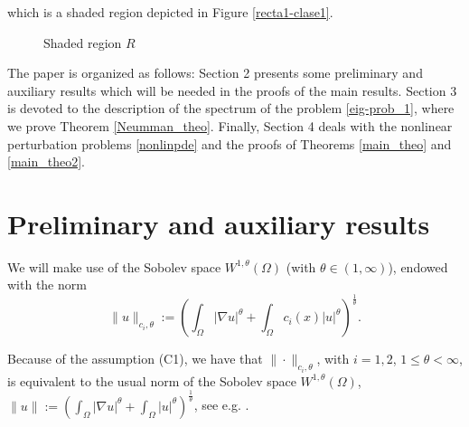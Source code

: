 \documentclass[pdflatex,sn-mathphys-num]{sn-jnl}
\theoremstyle{thmstyleone}%
\theoremstyle{thmstyletwo}%
\theoremstyle{thmstylethree}%
\theoremstyle{thmstylethree}%
\begin{document}
which is a shaded region depicted in Figure \ref{recta1-clase1}.

\begin{figure}
    \centering
{}
  \caption{Shaded region $R$} 
\end{figure}\label{recta1-clase1}


The paper is organized as follows: Section 2 presents some preliminary and auxiliary results which will be needed in the proofs of the main results. Section 3 is devoted  to the description of the spectrum of the  problem \eqref{eig-prob_1}, where we prove Theorem \eqref{Neumman_theo}.
Finally, Section 4 deals with the nonlinear perturbation problems \eqref{nonlinpde} and the proofs of  Theorems \eqref{main_theo} and \eqref{main_theo2}.


\section{Preliminary and auxiliary results}

We will make use of the Sobolev space $W^{1,\theta} (\Omega)$ (with  $\theta \in (1,\infty)$), endowed with the  norm  \begin{equation*}
 \|u\|_{c_i,\theta}:=\left( \int_\Omega |\nabla u|^{\theta}+\int_\Omega c_i(x)|u|^{\theta}\right)^\frac{1}{\theta}. 
\end{equation*}

Because of the assumption {\rm (C1)}, we have that  $\|\cdot\|_{c_i,\theta}$, with $i=1,2$,  $1\leqslant \theta <\infty$, is equivalent to the usual norm of the Sobolev space $W^{1,\theta}(\Omega)$, $\displaystyle  \|u\|:= \left(\int_\Omega |\nabla u|^{\theta}+\int_\Omega |u|^{\theta}\right)^{\frac{1}{\theta}}$, see e.g. \cite[Lemma 1]{BLMG}. 
\end{document}
